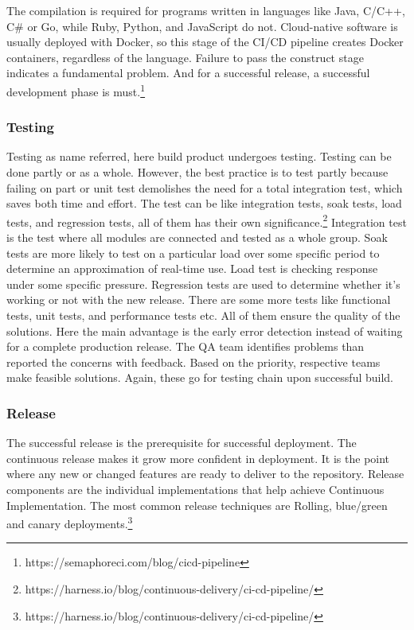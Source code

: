 The compilation is required for programs written in languages like Java, C/C++, C\# or Go, while Ruby, Python, and JavaScript do not. Cloud-native software is usually deployed with Docker, so this stage of the CI/CD pipeline creates Docker containers, regardless of the language. Failure to pass the construct stage indicates a fundamental problem. And for a successful release, a successful development phase is must.\footnote{https://semaphoreci.com/blog/cicd-pipeline}


\subsubsection{Testing}
Testing as name referred, here build product undergoes testing. Testing can be done partly or as a whole. However, the best practice is to test partly because failing on part or unit test demolishes the need for a total integration test, which saves both time and effort. The test can be like integration tests, soak tests, load tests, and regression tests, all of them has their own significance.\footnote{https://harness.io/blog/continuous-delivery/ci-cd-pipeline/} Integration test is the test where all modules are connected and tested as a whole group. Soak tests are more likely to test on a particular load over some specific period to determine an approximation of real-time use. Load test is checking response under some specific pressure. Regression tests are used to determine whether it's working or not with the new release. There are some more tests like functional tests, unit tests, and performance tests etc. All of them ensure the quality of the solutions. Here the main advantage is the early error detection instead of waiting for a complete production release. The QA team identifies problems than reported the concerns with feedback. Based on the priority, respective teams make feasible solutions. Again, these go for testing chain upon successful build.


\subsubsection{Release}

The successful release is the prerequisite for successful deployment. The continuous release makes it grow more confident in deployment. It is the point where any new or changed features are ready to deliver to the repository. Release components are the individual implementations that help achieve Continuous Implementation. The most common release techniques are Rolling, blue/green and canary deployments.\footnote{https://harness.io/blog/continuous-delivery/ci-cd-pipeline/}

